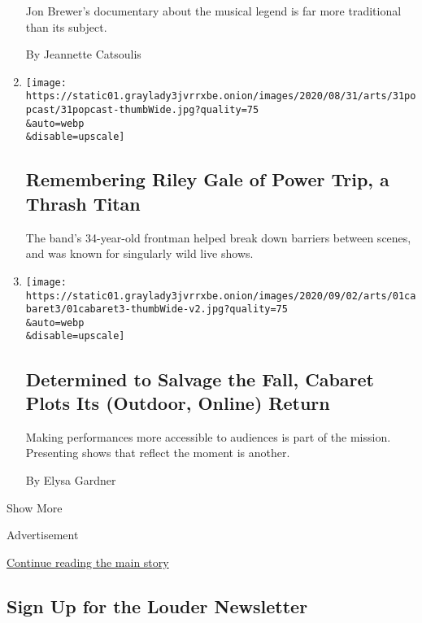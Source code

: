 \begin{enumerate}
  Jon Brewer's documentary about the musical legend is far more
  traditional than its subject.

  By Jeannette Catsoulis
\item
  \href{/2020/09/01/arts/music/popcast-riley-gale-power-trip.html}{}

  \texttt{[image: https://static01.graylady3jvrrxbe.onion/images/2020/08/31/arts/31popcast/31popcast-thumbWide.jpg?quality=75\\\&auto=webp\\\&disable=upscale]}

  \hypertarget{remembering-riley-gale-of-power-trip-a-thrash-titan}{%
  \subsection{Remembering Riley Gale of Power Trip, a Thrash
  Titan}\label{remembering-riley-gale-of-power-trip-a-thrash-titan}}

  The band's 34-year-old frontman helped break down barriers between
  scenes, and was known for singularly wild live shows.
\item
  \href{/2020/09/01/arts/music/cabaret-fall-season.html}{}

  \texttt{[image: https://static01.graylady3jvrrxbe.onion/images/2020/09/02/arts/01cabaret3/01cabaret3-thumbWide-v2.jpg?quality=75\\\&auto=webp\\\&disable=upscale]}

  \hypertarget{determined-to-salvage-the-fall-cabaret-plots-its-outdoor-online-return}{%
  \subsection{Determined to Salvage the Fall, Cabaret Plots Its
  (Outdoor, Online)
  Return}\label{determined-to-salvage-the-fall-cabaret-plots-its-outdoor-online-return}}

  Making performances more accessible to audiences is part of the
  mission. Presenting shows that reflect the moment is another.

  By Elysa Gardner
\end{enumerate}

Show More

Advertisement

\protect\hyperlink{after-mid2}{Continue reading the main story}

\hypertarget{sign-up-for-the-louder-newsletter}{%
\subsection{Sign Up for the Louder
Newsletter}\label{sign-up-for-the-louder-newsletter}}

